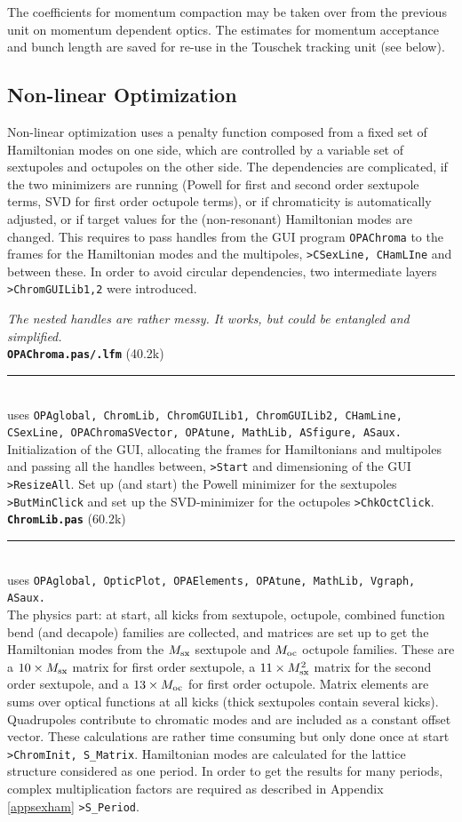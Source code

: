 \documentclass[12pt]{article}
\newcommand\code[1]{{\tt #1}}
\newcommand{\todo}[1]{{\color{red}\em #1}}
\newcommand\opamodule[3]{{\bf \tt #1} #2\\  \rule[3pt]{\textwidth}{0.2pt} \\ {\scriptsize uses \tt  #3}\\[1ex]}
\begin{document}
The coefficients for momentum compaction may be taken over from the previous unit on momentum dependent optics. The estimates for momentum acceptance and bunch length are saved for re-use in the Touschek tracking unit (see below).\\

\subsection{Non-linear Optimization}
Non-linear optimization uses a penalty function composed from a fixed set of Hamiltonian modes on one side, which are controlled by a variable set of sextupoles and octupoles on the other side.
The dependencies are complicated, if the two minimizers are running (Powell for first and second order sextupole terms, SVD for first order octupole terms), or if chromaticity is automatically adjusted, or if target values for the (non-resonant) Hamiltonian modes are changed. This requires to pass handles from the GUI program \code{OPAChroma} to the frames for the Hamiltonian modes and the multipoles, \code{>CSexLine, CHamLIne} and between these. In order to avoid circular dependencies, two intermediate layers \code{>ChromGUILib1,2} were introduced.

\todo{The nested handles are rather messy. It works, but could be entangled and simplified.}\\

\opamodule{OPAChroma.pas/.lfm}{(40.2k)}{OPAglobal, ChromLib, ChromGUILib1, ChromGUILib2, CHamLine, CSexLine, OPAChromaSVector, OPAtune, MathLib, ASfigure, ASaux.}
Initialization of the GUI, allocating the frames for Hamiltonians and multipoles and passing all the handles between, \code{>Start} and dimensioning of the GUI \code{>ResizeAll}.
Set up (and start) the Powell minimizer for the sextupoles \code{>ButMinClick} and set up the SVD-minimizer for the octupoles \code{>ChkOctClick}.\\

\opamodule{ChromLib.pas}{(60.2k)}{OPAglobal, OpticPlot, OPAElements, OPAtune,  MathLib, Vgraph, ASaux.}
The physics part: at start, all kicks from sextupole, octupole, combined function bend (and decapole) families are collected, and matrices are set up to get the Hamiltonian modes from the $M_{\rm sx}$ sextupole and $M_{\rm oc}$ octupole families. These are a $10\times  M_{\rm sx}$ matrix for first order sextupole, a $11\times  M_{\rm sx}^2$ matrix for the second order sextupole, and a  $13\times  M_{\rm oc}$ for first order octupole. Matrix elements are sums over optical functions at all kicks (thick sextupoles contain several kicks). Quadrupoles contribute to chromatic modes and are included as a constant offset vector. These calculations are rather time consuming but only done once at start \code{>ChromInit, S\_Matrix}. Hamiltonian modes are calculated for the lattice structure considered as one period. In order to get the results for many periods, complex multiplication factors are required as described in Appendix \ref{appsexham} \code{>S\_Period}.
\end{document}
